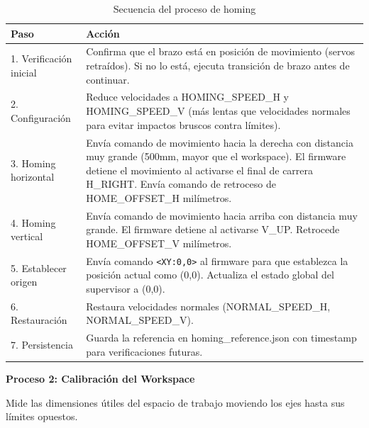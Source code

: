 \begin{table}[H]
\centering
\small
\begin{tabular}{|l|p{10cm}|}
\hline
\textbf{Paso} & \textbf{Acción} \\
\hline
1. Verificación inicial & Confirma que el brazo está en posición de movimiento (servos retraídos). Si no lo está, ejecuta transición de brazo antes de continuar. \\
\hline
2. Configuración & Reduce velocidades a HOMING\_SPEED\_H y HOMING\_SPEED\_V (más lentas que velocidades normales para evitar impactos bruscos contra límites). \\
\hline
3. Homing horizontal & Envía comando de movimiento hacia la derecha con distancia muy grande (500mm, mayor que el workspace). El firmware detiene el movimiento al activarse el final de carrera H\_RIGHT. Envía comando de retroceso de HOME\_OFFSET\_H milímetros. \\
\hline
4. Homing vertical & Envía comando de movimiento hacia arriba con distancia muy grande. El firmware detiene al activarse V\_UP. Retrocede HOME\_OFFSET\_V milímetros. \\
\hline
5. Establecer origen & Envía comando \texttt{<XY:0,0>} al firmware para que establezca la posición actual como (0,0). Actualiza el estado global del supervisor a (0,0). \\
\hline
6. Restauración & Restaura velocidades normales (NORMAL\_SPEED\_H, NORMAL\_SPEED\_V). \\
\hline
7. Persistencia & Guarda la referencia en homing\_reference.json con timestamp para verificaciones futuras. \\
\hline
\end{tabular}
\caption{Secuencia del proceso de homing}
\label{tab:proceso_homing}
\end{table}

\textbf{Proceso 2: Calibración del Workspace}

Mide las dimensiones útiles del espacio de trabajo moviendo los ejes hasta sus límites opuestos.

